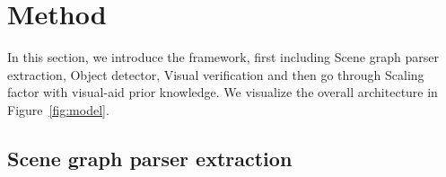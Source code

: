 \section{Method}


In this section, we introduce the framework, first including Scene graph parser extraction, Object detector, Visual verification and then go through Scaling factor with visual-aid prior knowledge. We visualize the overall architecture in Figure~\ref{fig:model}.




\subsection{Scene graph parser extraction}
\label{sec:method_1}



